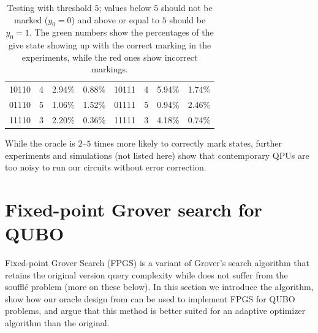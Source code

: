 \documentclass[reqno, 12pt]{amsart}
\numberwithin{equation}{section}                %
\begin{document}
\begin{table}[ht]
\begin{tabular}{|c|c|c|c||c|c|c|c|}
      10110 & 4 & {\color{ForestGreen} 2.94\%} & {\color{Red} 0.88\%} & 10111 & 4 & {\color{ForestGreen} 5.94\%} & {\color{Red} 1.74\%} \\
      01110 & 5 & {\color{Red} 1.06\%} & {\color{ForestGreen} 1.52\%} & 01111 & 5 & {\color{Red} 0.94\%} & {\color{ForestGreen} 2.46\%} \\
      11110 & 3 & {\color{ForestGreen} 2.20\%} & {\color{Red} 0.36\%} & 11111 & 3 & {\color{ForestGreen} 4.18\%} & {\color{Red} 0.74\%} \\
      \hline
   \end{tabular}
   \caption{Testing with threshold $5$; values below $5$ should not be marked ($y_0 = 0$) and above or equal to $5$ should be $y_0 = 1$. The {\color{ForestGreen} green} numbers show the percentages of the give state showing up with the correct marking in the experiments, while the {\color{Red} red} ones show incorrect markings.}
   \label{table:oracle}
\end{table}

While the oracle is $2$--$5$ times more likely to correctly mark states, further experiments and simulations (not listed here) show that contemporary QPUs are too noisy to run our circuits without error correction.

\bigskip

\section{Fixed-point Grover search for QUBO}
\label{sec:grover_for_qubo}

Fixed-point Grover Search (FPGS) \cite{yoder_fixed_2014} is a variant of Grover's search algorithm that retains the original version query complexity while does not suffer from the souffl\'e problem (more on these below). In this section we introduce the algorithm, show how our oracle design from  can be used to implement FPGS for QUBO problems, and argue that this method is better suited for an adaptive optimizer algorithm than the original.

\smallskip
\end{document}
